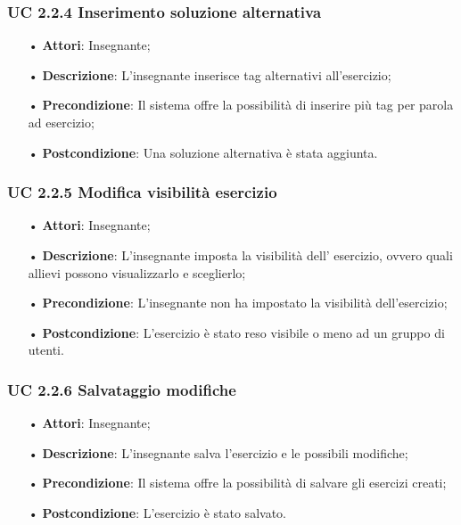\subsubsection{UC 2.2.4 Inserimento soluzione alternativa}
\begin{itemize}
	\item[•] \textbf{Attori}: Insegnante;
	\item[•] \textbf{Descrizione}: L'insegnante inserisce tag alternativi all’esercizio;
	\item[•] \textbf{Precondizione}: Il sistema offre la possibilità di inserire più tag per parola ad esercizio;
	\item[•] \textbf{Postcondizione}: Una soluzione alternativa è stata aggiunta.
\end{itemize}

\subsubsection{UC 2.2.5 Modifica visibilità esercizio}
\begin{itemize}
	\item[•] \textbf{Attori}: Insegnante;
	\item[•] \textbf{Descrizione}: L’insegnante imposta la visibilità dell' esercizio, ovvero quali allievi possono visualizzarlo e sceglierlo;
	\item[•] \textbf{Precondizione}: L'insegnante non ha impostato la visibilità dell'esercizio;
	\item[•] \textbf{Postcondizione}: L’esercizio è stato reso visibile o meno ad un gruppo di utenti.
\end{itemize}
\subsubsection{UC 2.2.6 Salvataggio modifiche}
\begin{itemize}
	\item[•] \textbf{Attori}: Insegnante;
	\item[•] \textbf{Descrizione}: L'insegnante salva l'esercizio e le possibili modifiche;
	\item[•] \textbf{Precondizione}: Il sistema offre la possibilità di salvare gli esercizi creati;
	\item[•] \textbf{Postcondizione}: L'esercizio è stato salvato.
\end{itemize}
